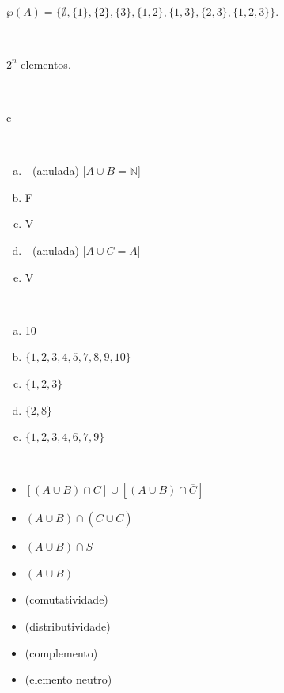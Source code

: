 \begin{Gabarito}{7}
~

    $\wp(A) = \{\emptyset, \{1\}, \{2\}, \{3\}, \{1, 2\}, \{1, 3\}, \{2, 3\}, \{1, 2, 3\}\}$.
\end{Gabarito}
\begin{Gabarito}{8}
~

    $2^n$ elementos.
\end{Gabarito}
\begin{Gabarito}{9}
~

    c
\end{Gabarito}
\begin{Gabarito}{10}
~

    \begin{multicols}{2}
    \begin{enumerate}[a)]
        \item - (anulada) [$A \cup B = \mathbb{N}$]
        \item F
        \item V
        \item - (anulada) [$A \cup C = A$]
        \item V
    \end{enumerate}
\end{multicols}
\end{Gabarito}
\begin{Gabarito}{11}
~

    \begin{multicols}{2}
    \begin{enumerate}[a)]
        \item 10
        \item $\{1,2,3,4,5,7,8,9,10\}$
        \item $\{ 1,2,3 \}$
        \item $\{ 2,8 \}$
        \item $\{ 1,2,3,4,6,7,9 \}$
    \end{enumerate}
\end{multicols}
\end{Gabarito}
\begin{Gabarito}{12}
~

    \begin{multicols}{2}
        \begin{itemize}
            \item $[(A \cup B) \cap C] \cup \left[(A \cup B) \cap \overline{C} \right]$
            \item $(A \cup B) \cap (C \cup \overline{C})$
            \item $(A \cup B) \cap S$
            \item $(A \cup B)$
        \end{itemize}

        \begin{itemize}
            \item (comutatividade)
            \item (distributividade)
            \item (complemento)
            \item (elemento neutro)
        \end{itemize}
    \end{multicols}
\end{Gabarito}
